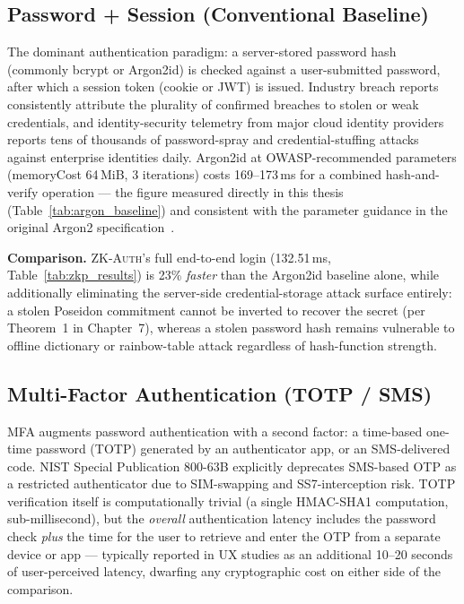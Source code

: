 \documentclass[12pt,a4paper,oneside]{report}
\begin{document}
\subsection{Password + Session (Conventional Baseline)}

The dominant authentication paradigm: a server-stored password hash
(commonly bcrypt or Argon2id) is checked against a user-submitted
password, after which a session token (cookie or JWT) is issued.
Industry breach reports consistently attribute the plurality of
confirmed breaches to stolen or weak credentials, and identity-security
telemetry from major cloud identity providers reports tens of thousands
of password-spray and credential-stuffing attacks against enterprise
identities daily.
Argon2id at OWASP-recommended parameters (memoryCost 64\,MiB, 3
iterations) costs 169--173\,ms for a combined hash-and-verify
operation --- the figure measured directly in this thesis
(Table~\ref{tab:argon_baseline}) and consistent with the parameter
guidance in the original Argon2 specification~\cite{argon2}.

\textbf{Comparison.} \textsc{ZK-Auth}'s full end-to-end login
(132.51\,ms, Table~\ref{tab:zkp_results}) is 23\% \textit{faster} than
the Argon2id baseline alone, while additionally eliminating the
server-side credential-storage attack surface entirely: a stolen
Poseidon commitment cannot be inverted to recover the secret (per
Theorem~1 in Chapter~7), whereas a stolen password hash remains
vulnerable to offline dictionary or rainbow-table attack regardless of
hash-function strength.

\subsection{Multi-Factor Authentication (TOTP / SMS)}
\label{sec:mfa_baseline}

MFA augments password authentication with a second factor: a
time-based one-time password (TOTP) generated
by an authenticator app, or an SMS-delivered code. NIST Special
Publication 800-63B explicitly deprecates SMS-based OTP as a
restricted authenticator due to SIM-swapping and SS7-interception
risk. TOTP verification itself is computationally
trivial (a single HMAC-SHA1 computation, sub-millisecond), but the
\textit{overall} authentication latency includes the password check
\textit{plus} the time for the user to retrieve and enter the OTP from a
separate device or app --- typically reported in UX studies as an
additional 10--20 seconds of user-perceived latency, dwarfing any
cryptographic cost on either side of the comparison.
\end{document}

